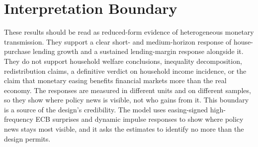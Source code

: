 \section{Interpretation Boundary}

These results should be read as reduced-form evidence of heterogeneous monetary transmission. They support a clear short- and medium-horizon response of house-purchase lending growth and a sustained lending-margin response alongside it. They do not support household welfare conclusions, inequality decomposition, redistribution claims, a definitive verdict on household income incidence, or the claim that monetary easing benefits financial markets more than the real economy. The responses are measured in different units and on different samples, so they show where policy news is visible, not who gains from it. This boundary is a source of the design's credibility. The model uses easing-signed high-frequency ECB surprises and dynamic impulse responses to show where policy news stays most visible, and it asks the estimates to identify no more than the design permits.
